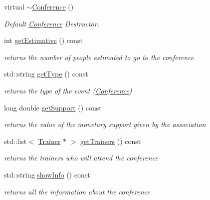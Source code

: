 \begin{DoxyCompactItemize}
virtual \hyperlink{classConference_aad7fc5f411279abc70d4ff3c30d2bdd8}{$\sim$\+Conference} ()
\begin{DoxyCompactList}\small\item\em Default \hyperlink{classConference}{Conference} Destructor. \end{DoxyCompactList}\item 
int \hyperlink{classConference_a9d96f80eb37bdbf57bf318c8bd484e88}{get\+Estimative} () const
\begin{DoxyCompactList}\small\item\em returns the number of people estimated to go to the conference \end{DoxyCompactList}\item 
std\+::string \hyperlink{classConference_ad1cf07b29a4c4cc36483603ef9536186}{get\+Type} () const
\begin{DoxyCompactList}\small\item\em returns the type of the event (\hyperlink{classConference}{Conference}) \end{DoxyCompactList}\item 
long double \hyperlink{classConference_a6ca3f0f7b2714881dbc108ea7f08646f}{get\+Support} () const
\begin{DoxyCompactList}\small\item\em returns the value of the monetary support given by the association \end{DoxyCompactList}\item 
std\+::list$<$ \hyperlink{classTrainer}{Trainer} $\ast$ $>$ \hyperlink{classConference_aae9e92d48205a80fa42e94564e3568c5}{get\+Trainers} () const
\begin{DoxyCompactList}\small\item\em returns the trainers who will attend the conference \end{DoxyCompactList}\item 
std\+::string \hyperlink{classConference_a7a2f7b38c728f487d82356d3c671ef88}{show\+Info} () const
\begin{DoxyCompactList}\small\item\em returns all the information about the conference \end{DoxyCompactList}\end{DoxyCompactItemize}
